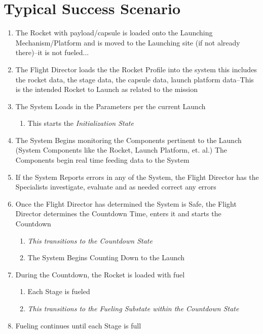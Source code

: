 \documentclass[letterpaper]{article}
\begin{document}
\section{Typical Success Scenario}
\begin{enumerate}
   \item The Rocket with payload/capsule is loaded onto the Launching
      Mechanism/Platform and is moved to the Launching site (if not 
      already there)--it is not fueled...
   \item The Flight Director loads the the Rocket Profile into the
      system this includes the rocket data, the stage data, the 
      capsule data, launch platform data--This is the intended Rocket
      to Launch as related to the mission
   \item The System Loads in the Parameters per the current Launch
      \begin{enumerate}
         \item This starts the \textit{Initialization State}
      \end{enumerate}
   \item The System Begins monitoring the Components pertinent to the
      Launch (System Components like the Rocket, Launch Platform, 
      et. al.) The Components begin real time feeding data to the
      System
   \item If the System Reports errors in any of the System, the 
      Flight Director has the Specialists investigate, evaluate and as
      needed correct any errors
   \item Once the Flight Director has determined the System is Safe,
      the Flight Director determines the Countdown Time, enters it and
      starts the Countdown
      \begin{enumerate}
         \item \textit{This transitions to the Countdown State}
         \item The System Begins Counting Down to the Launch
      \end{enumerate}
   \item During the Countdown, the Rocket is loaded with fuel
      \begin{enumerate}
         \item Each Stage is fueled
         \item \textit{This transitions to the Fueling Substate within
            the Countdown State}
      \end{enumerate}
   \item Fueling continues until each Stage is full

\end{enumerate}
\end{document}
